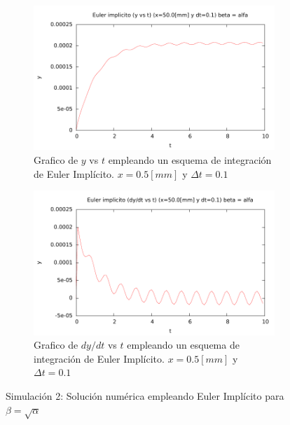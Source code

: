 \begin{center}
\begin{figure} [H]
	\begin{subfigure}[b]{0.8\textwidth}
		\includegraphics{./parte3/graficos/grafico_euler_S2_y_b2.pdf}
		\caption{Grafico de $y$ vs $t$ empleando un esquema de integración de Euler Implícito. $x=0.5[mm]$ y $\Delta t=0.1$} 
		\label{fig:eulerS2b2_y}
	\end{subfigure}
	
	\begin{subfigure}[b]{0.8\textwidth}
		\includegraphics{./parte3/graficos/grafico_euler_S2_dy_b2.pdf}
		\caption{Grafico de $dy/dt$ vs $t$ empleando un esquema de integración de Euler Implícito. $x=0.5[mm]$ y $\Delta t=0.1$} 
		\label{fig:eulerS2b2_dy}
	\end{subfigure}
\caption{Simulación 2: Solución numérica empleando Euler Implícito para $\beta=\sqrt{\alpha}$}
\end{figure}
\end{center}

